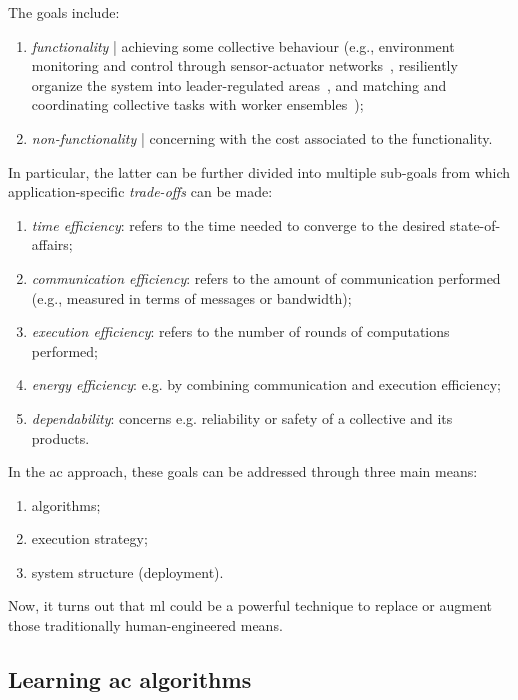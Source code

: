 The goals include:
\begin{enumerate}
\item \emph{functionality} | achieving some collective behaviour (e.g., 
  environment monitoring and control through sensor-actuator networks~\cite{DBLP:journals/fi/CasadeiPPVW20,danilo2021lmcs},
 resiliently organize the system into leader-regulated areas~\cite{DBLP:conf/coordination/CasadeiPVN19},
 and 
 matching and coordinating collective tasks with worker ensembles~\cite{DBLP:journals/eaai/CasadeiVAPD21});

\item \emph{non-functionality} | concerning with the cost associated to the functionality.
\end{enumerate}
%
In particular, the latter can be further divided into multiple sub-goals from which application-specific \emph{trade-offs} can be made:
\begin{enumerate}
\item \emph{time efficiency}: refers to the time needed to converge to the desired state-of-affairs;
\item \emph{communication efficiency}: refers to the amount of communication performed (e.g., measured in terms of messages or bandwidth);
\item \emph{execution efficiency}: refers to the number of rounds of computations performed;
\item \emph{energy efficiency}: e.g. by combining communication and execution efficiency;
\item \emph{dependability}: concerns e.g. reliability or safety of a collective and its products. 
\end{enumerate}

In the \ac{ac} approach, 
 these goals can be addressed through three main means:
%
\begin{enumerate}
\item algorithms;
\item execution strategy;
\item system structure (deployment).
\end{enumerate}
%
Now, it turns out that \ac{ml}
 could be a powerful technique
 to replace
 or augment
 those traditionally human-engineered means.
\subsection{Learning \ac{ac} algorithms}

